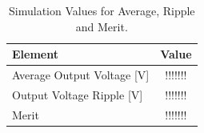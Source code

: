 \begin{table}[h]
    \centering
    \begin{tabular}{|l|c|}
    \hline
    {\bf Element } & {\bf Value } \\
    \hline \hline
    Average Output Voltage [V] & !!!!!!! \\
    \hline
    Output Voltage Ripple [V] & !!!!!!! \\
    \hline
    Merit & !!!!!!! \\
    \hline
    \end{tabular}
    \caption{Simulation Values for Average, Ripple and Merit.}
    \label{tab:tsim1}
\end{table}








